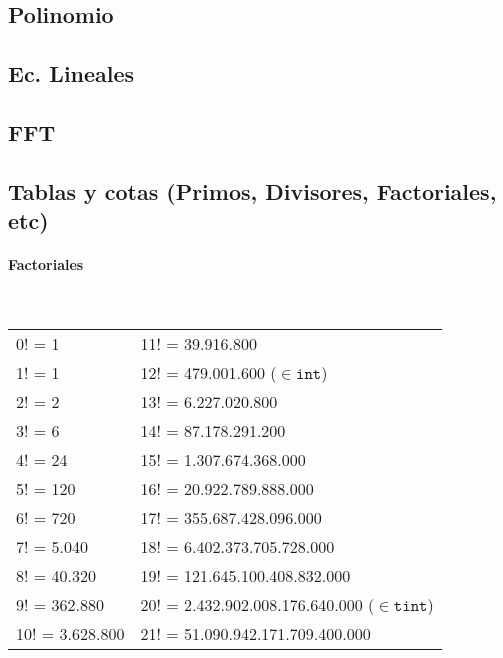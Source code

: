 \subsection{Polinomio}
\subsection{Ec. Lineales}
\subsection{FFT}
\subsection{Tablas y cotas (Primos, Divisores, Factoriales, etc)}
\paragraph{Factoriales} \ \\
\begin{tabular}{l|l}
0! =	1             & 11! = 39.916.800  \\
1! =	1             & 12! =	479.001.600	($\in \mathtt{int}$)\\
2! =	2             & 13! =	6.227.020.800	\\
3! =	6             & 14! =	87.178.291.200	\\
4! =	24            & 15! =	1.307.674.368.000	\\
5! =	120   			  & 16! =	20.922.789.888.000	\\
6! =	720           & 17! =	355.687.428.096.000	\\
7! =	5.040	        & 18! =	6.402.373.705.728.000	\\
8! =	40.320	      & 19! =	121.645.100.408.832.000	\\
9! =	362.880       & 20! =	2.432.902.008.176.640.000	($\in \mathtt{tint}$) \\
10! =	3.628.800     & 21! =	51.090.942.171.709.400.000
\end{tabular}
 
